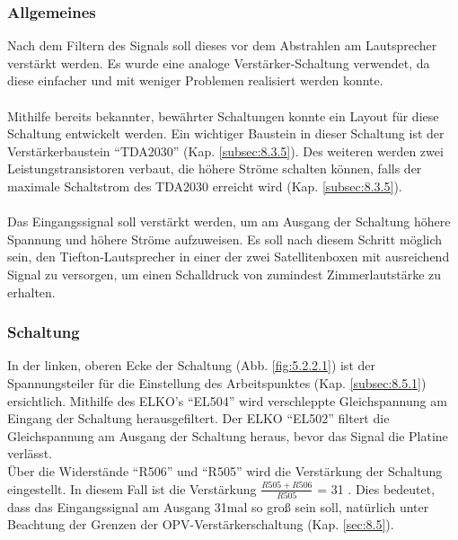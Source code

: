 \subsubsection{Allgemeines}\label{subsec:5.2.1}
Nach dem Filtern des Signals soll dieses vor dem Abstrahlen am Lautsprecher verstärkt werden.
Es wurde eine analoge Verstärker-Schaltung verwendet, da diese einfacher und mit weniger Problemen realisiert werden konnte.
\\ \\
Mithilfe bereits bekannter, bewährter Schaltungen konnte ein Layout für diese Schaltung entwickelt werden.
Ein wichtiger Baustein in dieser Schaltung ist der Verstärkerbaustein \enquote{TDA2030} (Kap. \ref{subsec:8.3.5}).
Des weiteren werden zwei Leistungstransistoren verbaut, die höhere Ströme schalten können, falls der maximale Schaltstrom des TDA2030 erreicht wird (Kap. \ref{subsec:8.3.5}).
\\ \\
Das Eingangssignal soll verstärkt werden, um am Ausgang der Schaltung höhere Spannung und höhere Ströme aufzuweisen.
Es soll nach diesem Schritt möglich sein, den Tiefton-Lautsprecher in einer der zwei Satellitenboxen mit ausreichend Signal zu versorgen, um einen Schalldruck von zumindest Zimmerlautstärke zu erhalten. 

\newpage
\subsubsection{Schaltung}\label{subsec:5.2.2}
In der linken, oberen Ecke der Schaltung (Abb. \ref{fig:5.2.2.1}) ist der Spannungsteiler für die Einstellung des Arbeitspunktes (Kap. \ref{subsec:8.5.1}) ersichtlich.
Mithilfe des ELKO's \enquote{EL504} wird verschleppte Gleichspannung am Eingang der Schaltung herausgefiltert.
Der ELKO \enquote{EL502} filtert die Gleichspannung am Ausgang der Schaltung heraus, bevor das Signal die Platine verlässt. \\
Über die Widerstände \enquote{R506} und \enquote{R505} wird die Verstärkung der Schaltung eingestellt.
In diesem Fall ist die Verstärkung $\frac{R505+R506}{R505}$ = 31 .
Dies bedeutet, dass das Eingangssignal am Ausgang 31mal so groß sein soll, natürlich unter Beachtung der Grenzen der OPV-Verstärkerschaltung (Kap. \ref{sec:8.5}).


